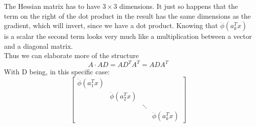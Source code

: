 The Hessian matrix has to have $3\times3$ dimensions. 
It just so happens that the term on the right of the dot product in the result has the same dimensions as the gradient, which will invert, since we have a dot product. 
Knowing that $\ddot\phi(a_k^{T}x)$ is a scalar the second term looks very much like a multiplication between a vector and a diagonal matrix.\\Thus we can elaborate more of the structure 
\begin{equation}
A \cdot AD = AD^{T}A^{T} = ADA^{T}
\end{equation}
With D being, in this specific case:
\begin{equation}
\begin{bmatrix}
 \ddot\phi(a_1^{T}x)&  & &\\
 &\ddot\phi(a_2^{T}x) & &\\ 
 &  &\ddots &\\ 
 &  & &\ddot\phi(a_k^{T}x)
\end{bmatrix}
\end{equation}
